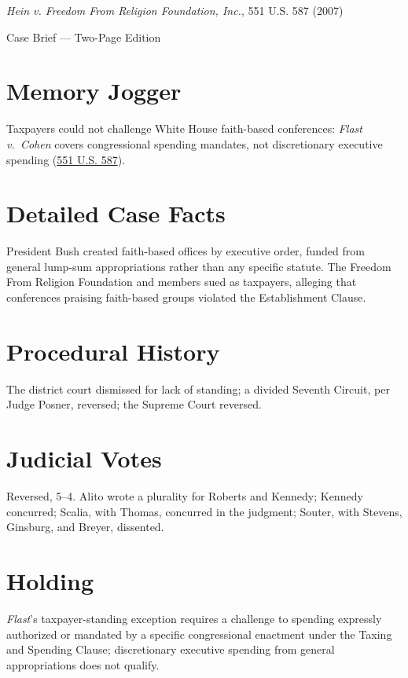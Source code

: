 \documentclass[12pt]{article}
\begin{document}
\begin{center}
{\LARGE \textit{Hein v. Freedom From Religion Foundation, Inc.}, 551 U.S. 587 (2007)\par}
\vspace{0.5em}
{\large Case Brief --- Two-Page Edition\par}
\end{center}

\section{Memory Jogger}
Taxpayers could not challenge White House faith-based conferences: \textit{Flast v.\ Cohen} covers congressional spending mandates, not discretionary executive spending (\href{https://supreme.justia.com/cases/federal/us/551/587/}{551 U.S. 587}).

\section{Detailed Case Facts}
President Bush created faith-based offices by executive order, funded from general lump-sum appropriations rather than any specific statute. The Freedom From Religion Foundation and members sued as taxpayers, alleging that conferences praising faith-based groups violated the Establishment Clause.

\section{Procedural History}
The district court dismissed for lack of standing; a divided Seventh Circuit, per Judge Posner, reversed; the Supreme Court reversed.

\section{Judicial Votes}
Reversed, 5--4. Alito wrote a plurality for Roberts and Kennedy; Kennedy concurred; Scalia, with Thomas, concurred in the judgment; Souter, with Stevens, Ginsburg, and Breyer, dissented.

\section{Holding}
\textit{Flast}'s taxpayer-standing exception requires a challenge to spending expressly authorized or mandated by a specific congressional enactment under the Taxing and Spending Clause; discretionary executive spending from general appropriations does not qualify.
\end{document}
